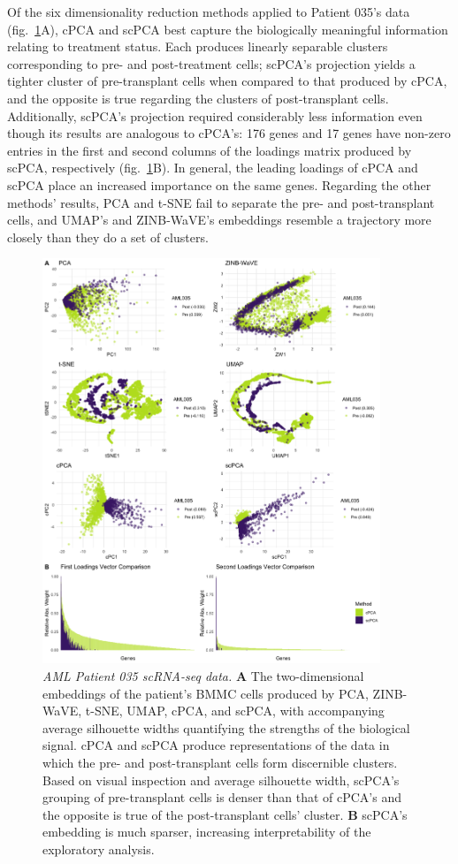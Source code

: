 Of the six dimensionality reduction methods applied to Patient 035's data (fig.~\ref{fig:comp_leuk_pat1}A), cPCA and scPCA best capture the biologically meaningful information relating to treatment status. Each produces linearly separable clusters corresponding to pre- and post-treatment cells; scPCA's projection yields a tighter cluster of pre-transplant cells when compared to that produced by cPCA, and the opposite is true regarding the clusters of post-transplant cells. Additionally, scPCA's projection required considerably less information even though its results are analogous to cPCA's: 176 genes and 17 genes have non-zero entries in the first and second columns of the loadings matrix produced by scPCA, respectively (fig.~\ref{fig:comp_leuk_pat1}B). In general, the leading loadings of cPCA and scPCA place an increased importance on the same genes. Regarding the other methods' results, PCA and t-SNE fail to separate the pre- and post-transplant cells, and UMAP's and ZINB-WaVE's embeddings resemble a trajectory more closely than they do a set of clusters.
\FloatBarrier
\begin{figure}[!htbp]
  \centering
  \includegraphics[width=0.9\textwidth]{figures/aml035_results}
  \caption{{\em AML Patient 035 scRNA-seq data.} 
  \textbf{A} The two-dimensional embeddings of the patient's BMMC cells produced by PCA, ZINB-WaVE, t-SNE, UMAP, cPCA, and scPCA, with accompanying average silhouette widths quantifying the strengths of the biological signal. cPCA and scPCA produce representations of the data in which the pre- and post-transplant cells form discernible clusters. Based on visual inspection and average silhouette width, scPCA's grouping of pre-transplant cells is denser than that of cPCA's and the opposite is true of the post-transplant cells' cluster. \textbf{B} scPCA's embedding is much sparser, increasing interpretability of the exploratory analysis.}
  \label{fig:comp_leuk_pat1}
\end{figure}

